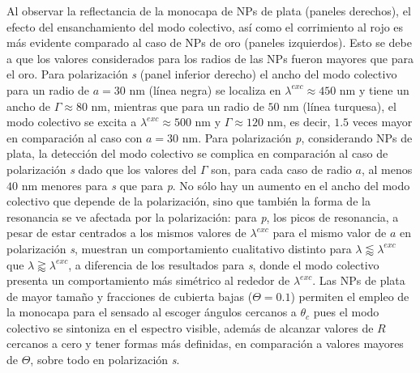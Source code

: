Al observar la reflectancia de la monocapa de NPs de plata  (paneles derechos), el efecto del ensanchamiento del modo colectivo, así como el corrimiento al rojo es más evidente comparado al caso de NPs de oro (paneles izquierdos). Esto se debe a  que los valores considerados para los radios de las NPs fueron mayores que para el oro. Para polarización \emph{s} (panel inferior derecho) el ancho del modo colectivo para un radio de $a=30$ nm (línea negra) se localiza en $\lambda^{exc}\approx 450$ nm y tiene un ancho de $\Gamma\approx 80$ nm, mientras que para un radio de $50$ nm (línea turquesa), el modo colectivo se excita a $\lambda^{exc}\approx 500$ nm y $\Gamma\approx 120$ nm, es decir, $1.5$ veces mayor en comparación al caso con $a=30$ nm. Para polarización \emph{p}, considerando NPs de plata, la detección del modo colectivo se complica en comparación al caso de polarización \emph{s} dado que los valores del $\Gamma$ son, para cada caso de radio $a$, al menos $40$ nm menores para \emph{s} que para \emph{p}. No sólo hay un aumento en el ancho del modo colectivo que depende de la polarización, sino que también la forma de la resonancia se ve afectada por la polarización: para \emph{p}, los picos de resonancia, a pesar de estar centrados a los mismos valores de $\lambda^{exc}$ para el mismo valor de $a$ en polarización \emph{s},  muestran un comportamiento cualitativo distinto para $\lambda\lessapprox\lambda^{exc}$ que $\lambda\gtrapprox\lambda^{exc}$, a diferencia de los resultados para \emph{s}, donde el modo colectivo presenta un comportamiento más simétrico al rededor de $\lambda^{exc}$. Las NPs de plata de mayor tamaño y fracciones de cubierta bajas ($\Theta= 0.1$) permiten el empleo de la monocapa para el sensado al escoger ángulos cercanos a $\theta_c$ pues el modo colectivo se sintoniza en el espectro visible, además de alcanzar valores de $R$ cercanos a cero y tener formas más definidas, en comparación a valores mayores de $\Theta$, sobre todo en polarización \emph{s}.


